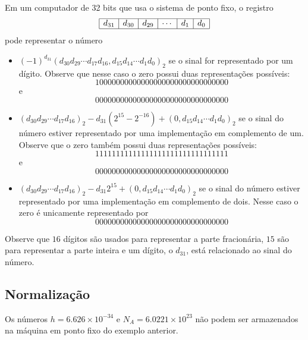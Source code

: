 \documentclass[main.tex]{subfiles}
\begin{document}
\begin{ex}
Em um computador de 32 bits que usa o sistema de ponto fixo, o registro
$$
\begin{array}{|c|c|c|c|c|c|} \hline
d_{31}&d_{30}&d_{29}&\cdots&d_1&d_0\\\hline
\end{array}
$$
pode representar o número
\begin{itemize}
\item $(-1)^{d_{31}}(d_{30}d_{29}\cdots d_{17}d_{16}, d_{15}d_{14}\cdots d_1d_0)_2$
se o sinal for representado por um dígito. Observe que nesse caso o zero possui duas representações possíveis: 
\begin{equation*}
  10000000000000000000000000000000  
\end{equation*}
e
\begin{equation*}
  00000000000000000000000000000000
\end{equation*}
\item $(d_{30}d_{29}\cdots d_{17}d_{16})_2-d_{31}(2^{15}-2^{-16})+(0,d_{15}d_{14}\cdots d_1d_0)_2$
se o sinal do número estiver representado por uma implementação em complemento de um. Observe que o zero também possui duas representações possíveis: 
\begin{equation*}
  11111111111111111111111111111111  
\end{equation*}
e
\begin{equation*}
  00000000000000000000000000000000
\end{equation*}
\item $(d_{30}d_{29}\cdots d_{17}d_{16})_2-d_{31}2^{15}+(0,d_{15}d_{14}\cdots d_1d_0)_2$
se o sinal do número estiver representado por uma implementação em complemento de dois. Nesse caso o zero é unicamente representado por
\begin{equation*}
  00000000000000000000000000000000  
\end{equation*}
\end{itemize}
Observe que $16$ dígitos são usados para representar a parte fracionária, $15$ são para representar a parte inteira e um dígito, o $d_{31}$, está relacionado ao sinal do número.
\end{ex}

\subsection{Normalização}
Os números $h=6.626\times 10^{-34}$ e $N_A=6.0221\times 10^{23}$ não podem ser armazenados na máquina em ponto fixo do exemplo anterior.
\end{document}
